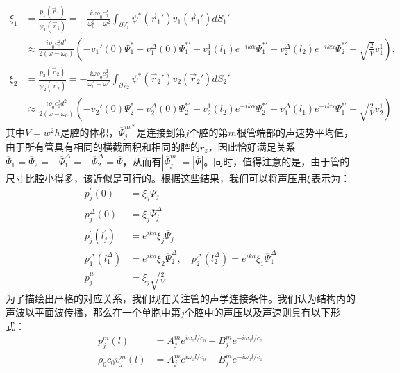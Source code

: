\begin{equation}\label{eq5-7}
    \begin{split}
    \xi_1 & = \frac{p_1(\vec{r}_1)}{\psi_1(\vec{r}_1)} = -\frac{i\omega\rho_0c_0^2}{\omega_0^2 - \omega^2} \int_{\partial V_1} \psi^*(\vec{r}_1')v_1(\vec{r}_1')dS_1' \\
    & \approx \frac{i\rho_0c_0^2d^2}{2(\omega - \omega_0)} (-v_1'(0) \Psi_1^* - v_1^{\Delta}(0) \Psi_1^{*'} + v_1^1(l_1) e^{-ik\alpha} \Psi_1^{*'} + v_2^{\Delta}(l_2) e^{-ik\alpha} \Psi_2^{*'} - \sqrt{\frac{2}{V}}v_1^1), \\
    \xi_2 & = \frac{p_2(\vec{r}_2)}{\psi_2(\vec{r}_2)} = -\frac{i\omega\rho_0c_0^2}{\omega_0^2 - \omega^2} \int_{\partial V_2} \psi^*(\vec{r}_2')v_2(\vec{r}_2')dS_2' \\
    & \approx \frac{i\rho_0c_0^2d^2}{2(\omega - \omega_0)} (-v_2'(0) \Psi_2^* - v_2^{\Delta}(0) \Psi_2^{*'} + v_2^1(l_2) e^{-ik\alpha} \Psi_2^{*'} + v_1^{\Delta}(l_1) e^{-ik\alpha} \Psi_1^{*'} - \sqrt{\frac{2}{V}}v_2^1)
    \end{split}
\end{equation}
其中$V = w^2h$是腔的体积，$\overline{\Psi}_j^{m*}$是连接到第$j$个腔的第$m$根管端部的声速势平均值，由于所有管具有相同的横截面积和相同的腔的$r_z$，因此恰好满足关系$\overline{\Psi}_1 = \overline{\Psi}_2 = -\overline{\Psi}_1^{\Delta} = -\overline{\Psi}_2^{\Delta} = \overline{\Psi}$，从而有$|\overline{\Psi}_j^{m}| = |\overline{\Psi}|$。同时，值得注意的是，由于管的尺寸比腔小得多，该近似是可行的。根据这些结果，我们可以将声压用$\xi$表示为：
\begin{equation}
    \begin{split}
    p_j^{'}(0) & = \xi_j\overline{\Psi}_j \\
    p_j^{\Delta}(0) & = \xi_j\overline{\Psi}_j^{\Delta} \\
    p_j^{'}(l_j^{'}) & = e^{ika} \xi_j\overline{\Psi}_j \\
    p_1^{\Delta}(l_1^{\Delta}) & = e^{ika} \xi_2\overline{\Psi}_2^{\Delta}, \quad p_2^{\Delta}(l_2^{\Delta}) = e^{ika} \xi_1\overline{\Psi}_1^{\Delta} \\
    p_j^{\mu} & = \xi_j\sqrt{\frac{2}{V}}
    \end{split}
    \label{eq5-8}
\end{equation}
为了描绘出严格的对应关系，我们现在关注管的声学连接条件。我们认为结构内的声波以平面波传播，那么在一个单胞中第$j$个腔中的声压以及声速则具有以下形式：
\begin{equation}
    \begin{split}
    p_j^m(l) &= A_j^m e^{i\omega_0 l / c_0} + B_j^m e^{-i\omega_0 l / c_0}\\
    \rho_0 c_0 v_j^m(l) &= A_j^m e^{i\omega_0 l / c_0} - B_j^m e^{-i\omega_0 l / c_0}
    \end{split}
    \label{eq5-9}
\end{equation}
